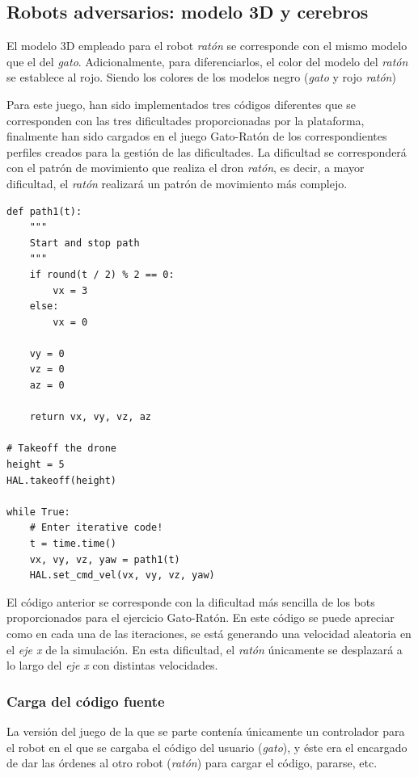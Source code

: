 \documentclass[a4paper, 12pt]{book}
\begin{document}
\subsection{Robots adversarios: modelo 3D y cerebros}

El modelo 3D empleado para el robot \emph{ratón} se corresponde con el mismo modelo que el del \emph{gato}. Adicionalmente, para diferenciarlos, el color del modelo del \emph{ratón} se establece al rojo. Siendo los colores de los modelos negro (\emph{gato} y rojo \emph{ratón})

Para este juego, han sido implementados tres códigos diferentes que se corresponden con las tres dificultades proporcionadas por la plataforma, finalmente han sido cargados en el juego Gato-Ratón de los correspondientes perfiles creados para la gestión de las dificultades. La dificultad se corresponderá con el patrón de movimiento que realiza el dron \emph{ratón}, es decir, a mayor dificultad, el \emph{ratón} realizará un patrón de movimiento más complejo.

\begin{lstlisting}
def path1(t):
	"""
	Start and stop path
	"""
	if round(t / 2) % 2 == 0:
		vx = 3
	else:
		vx = 0

	vy = 0
	vz = 0
	az = 0

	return vx, vy, vz, az
	
# Takeoff the drone
height = 5
HAL.takeoff(height)

while True:
    # Enter iterative code!
    t = time.time()
    vx, vy, vz, yaw = path1(t)
    HAL.set_cmd_vel(vx, vy, vz, yaw)
\end{lstlisting}

El código anterior se corresponde con la dificultad más sencilla de los bots proporcionados para el ejercicio Gato-Ratón. En este código se puede apreciar como en cada una de las iteraciones, se está generando una velocidad aleatoria en el \emph{eje x} de la simulación. En esta dificultad, el \emph{ratón} únicamente se desplazará a lo largo del \emph{eje x} con distintas velocidades.

\subsubsection{Carga del código fuente}
\label{drone_cat_mouse_code_load}

La versión del juego de la que se parte contenía únicamente un controlador para el robot en el que se cargaba el código del usuario (\emph{gato}), y éste era el encargado de dar las órdenes al otro robot (\emph{ratón}) para cargar el código, pararse, etc.
\end{document}
